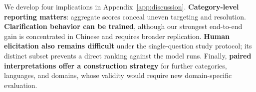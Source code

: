 We develop four implications in Appendix~\ref{app:discussion}. \textbf{Category-level reporting matters}: aggregate scores conceal uneven targeting and resolution. \textbf{Clarification behavior can be trained}, although our strongest end-to-end gain is concentrated in Chinese and requires broader replication. \textbf{Human elicitation also remains difficult} under the single-question study protocol; its distinct subset prevents a direct ranking against the model runs. Finally, \textbf{paired interpretations offer a construction strategy} for further categories, languages, and domains, whose validity would require new domain-specific evaluation.
